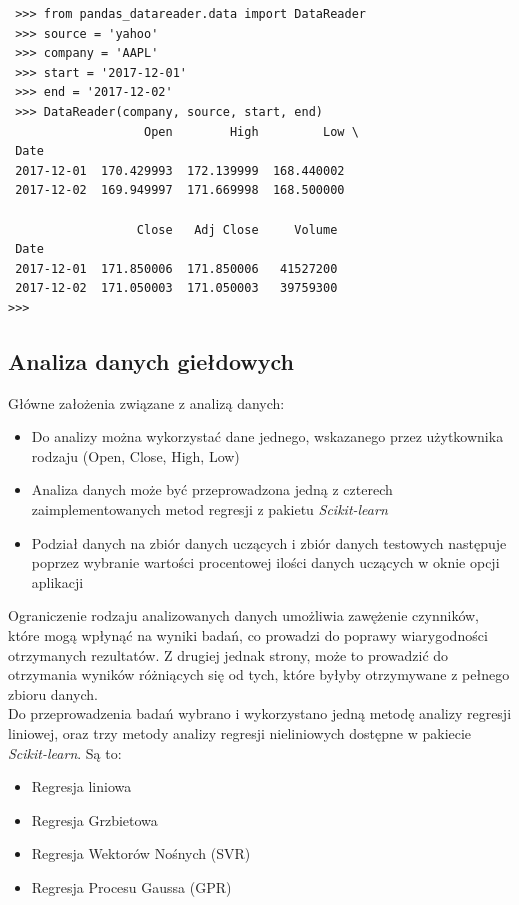 \begin{lstlisting}
 >>> from pandas_datareader.data import DataReader
 >>> source = 'yahoo'
 >>> company = 'AAPL'
 >>> start = '2017-12-01'
 >>> end = '2017-12-02'
 >>> DataReader(company, source, start, end)
                   Open        High         Low \      
 Date
 2017-12-01  170.429993  172.139999  168.440002  
 2017-12-02  169.949997  171.669998  168.500000  
 
                  Close   Adj Close     Volume
 Date
 2017-12-01  171.850006  171.850006   41527200
 2017-12-02  171.050003  171.050003   39759300
>>>
\end{lstlisting}

\subsection{Analiza danych giełdowych}

Główne założenia związane z analizą danych:
\begin{itemize}
 \item Do analizy można wykorzystać dane jednego, wskazanego przez użytkownika rodzaju (Open, Close, High, Low)
 \item Analiza danych może być przeprowadzona jedną z czterech zaimplementowanych metod regresji z pakietu \textit{Scikit-learn}
 \item Podział danych na zbiór danych uczących i zbiór danych testowych następuje poprzez wybranie wartości procentowej ilości danych uczących w oknie opcji aplikacji
\end{itemize}

Ograniczenie rodzaju analizowanych danych umożliwia zawężenie czynników, które mogą wpłynąć na wyniki badań, co prowadzi do poprawy wiarygodności otrzymanych rezultatów.
Z drugiej jednak strony, może to prowadzić do otrzymania wyników różniących się od tych, które byłyby otrzymywane z pełnego zbioru danych.\\

Do przeprowadzenia badań wybrano i wykorzystano jedną metodę analizy regresji liniowej, oraz trzy metody analizy regresji nieliniowych dostępne w pakiecie \textit{Scikit-learn}.
Są to:
\begin{itemize}
 \item Regresja liniowa
 \item Regresja Grzbietowa
 \item Regresja Wektorów Nośnych (SVR)
 \item Regresja Procesu Gaussa (GPR)
\end{itemize}

